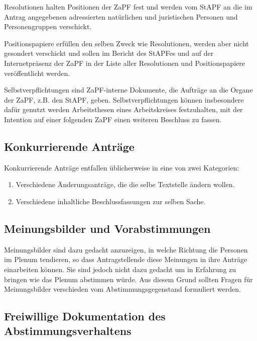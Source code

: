 \documentclass[
  ngerman,
  a4paper,
  oneside]{scrartcl}
\providecommand{\tightlist}{%
  \setlength{\itemsep}{0pt}\setlength{\parskip}{0pt}}
\begin{document}
Resolutionen halten Positionen der ZaPF fest und werden vom StAPF an die
im Antrag angegebenen adressierten natürlichen und juristischen Personen
und Personengruppen verschickt.

Positionspapiere erfüllen den selben Zweck wie Resolutionen, werden aber
nicht gesondert verschickt und sollen im Bericht des StAPFes und auf der
Internetpräsenz der ZaPF in der Liste aller Resolutionen und
Positionspapiere veröffentlicht werden.

Selbstverpflichtungen sind ZaPF-interne Dokumente, die Aufträge an die
Organe der ZaPF, z.B. den StAPF, geben. Selbstverpflichtungen können
insbesondere dafür genutzt werden Arbeitsthesen eines Arbeitskreises
festzuhalten, mit der Intention auf einer folgenden ZaPF einen weiteren
Beschluss zu fassen.

\subsection*{Konkurrierende Anträge}\label{konkurrierende-antruxe4ge}

Konkurrierende Anträge entfallen üblicherweise in eine von zwei
Kategorien:

\begin{enumerate}
\def\labelenumi{\arabic{enumi}.}
\tightlist
\item
  Verschiedene Änderungsanträge, die die selbe Textstelle ändern wollen.
\item
  Verschiedene inhaltliche Beschlussfassungen zur selben Sache.
\end{enumerate}

\subsection*{Meinungsbilder und
Vorabstimmungen}\label{meinungsbilder-und-vorabstimmungen}

Meinungsbilder sind dazu gedacht anzuzeigen, in welche Richtung die
Personen im Plenum tendieren, so dass Antragstellende diese Meinungen in
ihre Anträge einarbeiten können. Sie sind jedoch nicht dazu gedacht um
in Erfahrung zu bringen wie das Plenum abstimmen würde. Aus diesem Grund
sollten Fragen für Meinungsbilder verschieden vom Abstimmungsgegenstand
formuliert werden.

\subsection*{Freiwillige Dokumentation des
Abstimmungsverhaltens}\label{freiwillige-dokumentation-des-abstimmungsverhaltens}
\end{document}
